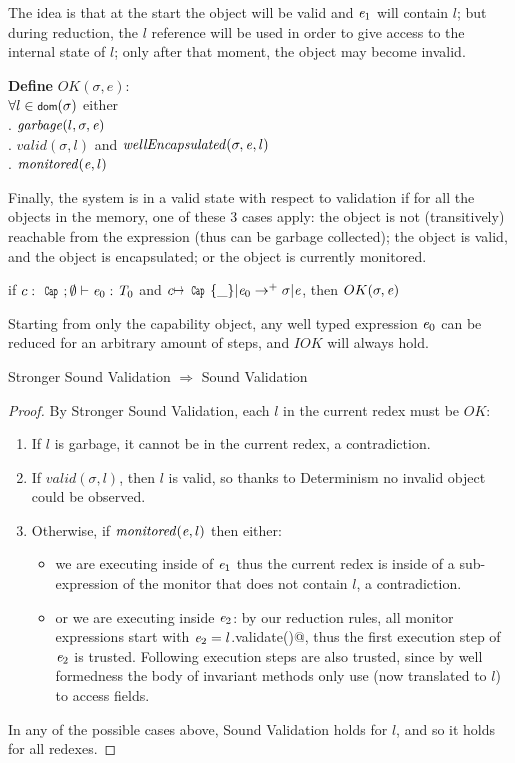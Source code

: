 The idea is that at the start the object will be valid and ${\mathit{e}}_1$ will contain $l$;
but during reduction, the $l$ reference will be used in order to
give access to the internal state of $l$; only after that moment, the object may become invalid.


\noindent\textbf{Define} $OK(\sigma,e)$:\\
\indent $\forall l\in\dom(\sigma)$
  either\\
\indent{}. $\mathit{garbage}(l,\sigma,\e)$\\
\indent{}. $\mathit{valid}(\sigma,l)$ and $\mathit{wellEncapsulated}(\sigma,\e,l)$\\
\indent{}. $\mathit{monitored}({\mathit{e}},l)$

Finally, the system is in a valid state with respect to validation
if for all the objects in the memory, one of these 3 cases apply:
the object is not (transitively) reachable from the expression (thus can be garbage collected);
the object is valid, and the object is encapsulated;
or the object is currently monitored.

\begin{theorem}
if $c:\Kw{Cap};\emptyset\vdash \e_0: \T_0$ and
$c\mapsto\Kw{Cap}\{\_\}|\e_0\rightarrow^+ \sigma|\e$, then
$OK(\sigma,\e)$
\end{theorem}
\noindent Starting from only the capability object,
any well typed expression ${\mathit{e}}_0$ can be reduced for an arbitrary amount of steps,
and $IOK$ will always hold.
\\
\begin{theorem} Stronger Sound Validation $\Rightarrow$ Sound Validation
\end{theorem}
\begin{proof}
\noindent By Stronger Sound Validation, each $l$ in the current redex must be $OK$:
\begin{enumerate}
	\item If $l$ is garbage, it cannot be in the current redex, a contradiction.
	\item If $\mathit{valid}(\sigma,l)$, then $l$ is valid, so thanks to Determinism
	no invalid object could be observed.
	\item Otherwise, if $\mathit{monitored}({\mathit{e}},l)$ then either:
	\begin{itemize}
	 \item we are executing inside of ${\mathit{e}}_1$ thus the current redex is inside of a sub-expression of the monitor that does not contain $l$, a contradiction.
	 \item or we are executing inside ${\mathit{e}}_2$:
	 by our reduction rules, all monitor expressions start with 
	 ${\mathit{e}}_2=l$\Q@.validate()@, thus the first execution step
	 of ${\mathit{e}}_2$ is trusted. Following execution steps are also trusted, since by well formedness the body of invariant methods only use \Q@this@ (now translated to $l$) to access fields.
	\end{itemize}
\end{enumerate}
In any of the possible cases above, Sound Validation holds for $l$, and so it holds for all redexes.
\end{proof}

